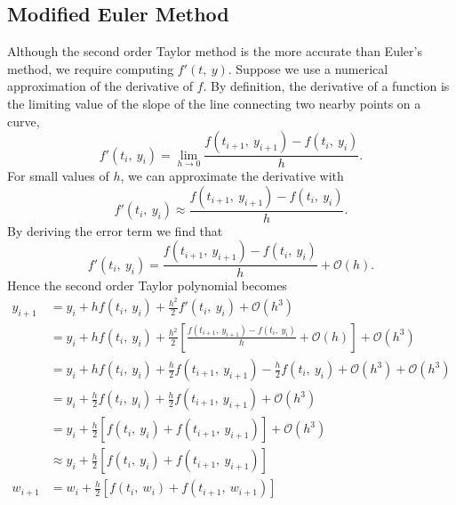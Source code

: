 \documentclass{article}
\begin{document}
\subsection{Modified Euler Method}
Although the second order Taylor method is the more accurate than
Euler's method, we require computing \(f'\left( t,\: y \right)\).
Suppose we use a numerical approximation of the derivative of \(f\). By
definition, the derivative of a function is the limiting value of the
slope of the line connecting two nearby points on a curve,
\begin{equation*}
    f'\left( t_i,\: y_i \right) = \lim_{h \to 0} \frac{f\left( t_{i + 1},\: y_{i + 1} \right) - f\left( t_i,\: y_i \right)}{h}.
\end{equation*}
For small values of \(h\), we can approximate the derivative with
\begin{equation*}
    f'\left( t_i,\: y_i \right) \approx \frac{f\left( t_{i + 1},\: y_{i + 1} \right) - f\left( t_i,\: y_i \right)}{h}.
\end{equation*}
By deriving the error term we find that
\begin{equation*}
    f'\left( t_i,\: y_i \right) = \frac{f\left( t_{i + 1},\: y_{i + 1} \right) - f\left( t_i,\: y_i \right)}{h} + \mathcal{O}\left( h \right).
\end{equation*}
Hence the second order Taylor polynomial becomes
\begin{align*}
    y_{i + 1} & = y_i + h f\left( t_i,\: y_i \right) + \frac{h^2}{2} f'\left( t_i,\: y_i \right) + \mathcal{O}\left( h^3 \right)                                                                                                \\
              & = y_i + h f\left( t_i,\: y_i \right) + \frac{h^2}{2} \left[ \frac{f\left( t_{i + 1},\: y_{i + 1} \right) - f\left( t_i,\: y_i \right)}{h} + \mathcal{O}\left( h \right) \right] + \mathcal{O}\left( h^3 \right) \\
              & = y_i + h f\left( t_i,\: y_i \right) + \frac{h}{2} f\left( t_{i + 1},\: y_{i + 1} \right) - \frac{h}{2} f\left( t_i,\: y_i \right) + \mathcal{O}\left( h^3 \right) + \mathcal{O}\left( h^3 \right)              \\
              & = y_i + \frac{h}{2} f\left( t_i,\: y_i \right) + \frac{h}{2} f\left( t_{i + 1},\: y_{i + 1} \right) + \mathcal{O}\left( h^3 \right)                                                                             \\
              & = y_i + \frac{h}{2} \left[ f\left( t_i,\: y_i \right) + f\left( t_{i + 1},\: y_{i + 1} \right) \right] + \mathcal{O}\left( h^3 \right)                                                                          \\
              & \approx y_i + \frac{h}{2} \left[ f\left( t_i,\: y_i \right) + f\left( t_{i + 1},\: y_{i + 1} \right) \right]                                                                                                    \\
    w_{i + 1} & = w_i + \frac{h}{2} \left[ f\left( t_i,\: w_i \right) + f\left( t_{i + 1},\: w_{i + 1} \right) \right]
\end{align*}
\end{document}
